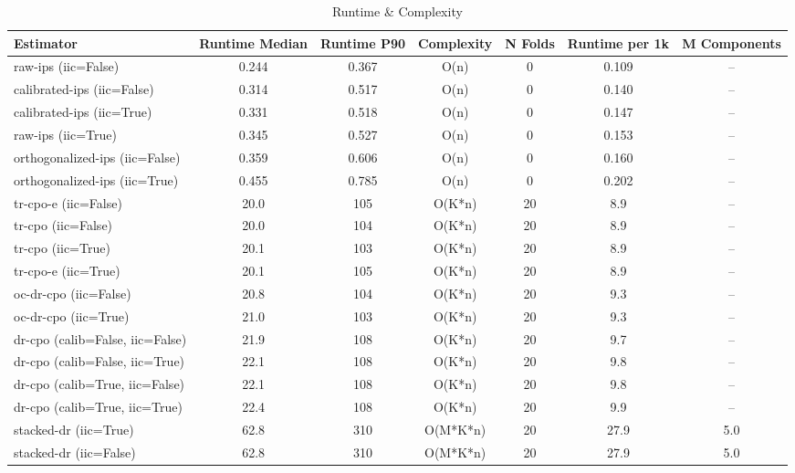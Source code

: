 \begin{table}[htbp]
\centering
\caption{Runtime & Complexity}
\label{tab:A6}
\begin{tabular}{l|cccccc}
\toprule
Estimator & Runtime Median & Runtime P90 & Complexity & N Folds & Runtime per 1k & M Components \\
\midrule
raw-ips (iic=False) & 0.244 & 0.367 & O(n) & 0 & 0.109 & -- \\
calibrated-ips (iic=False) & 0.314 & 0.517 & O(n) & 0 & 0.140 & -- \\
calibrated-ips (iic=True) & 0.331 & 0.518 & O(n) & 0 & 0.147 & -- \\
raw-ips (iic=True) & 0.345 & 0.527 & O(n) & 0 & 0.153 & -- \\
orthogonalized-ips (iic=False) & 0.359 & 0.606 & O(n) & 0 & 0.160 & -- \\
orthogonalized-ips (iic=True) & 0.455 & 0.785 & O(n) & 0 & 0.202 & -- \\
tr-cpo-e (iic=False) & 20.0 & 105 & O(K*n) & 20 & 8.9 & -- \\
tr-cpo (iic=False) & 20.0 & 104 & O(K*n) & 20 & 8.9 & -- \\
tr-cpo (iic=True) & 20.1 & 103 & O(K*n) & 20 & 8.9 & -- \\
tr-cpo-e (iic=True) & 20.1 & 105 & O(K*n) & 20 & 8.9 & -- \\
oc-dr-cpo (iic=False) & 20.8 & 104 & O(K*n) & 20 & 9.3 & -- \\
oc-dr-cpo (iic=True) & 21.0 & 103 & O(K*n) & 20 & 9.3 & -- \\
dr-cpo (calib=False, iic=False) & 21.9 & 108 & O(K*n) & 20 & 9.7 & -- \\
dr-cpo (calib=False, iic=True) & 22.1 & 108 & O(K*n) & 20 & 9.8 & -- \\
dr-cpo (calib=True, iic=False) & 22.1 & 108 & O(K*n) & 20 & 9.8 & -- \\
dr-cpo (calib=True, iic=True) & 22.4 & 108 & O(K*n) & 20 & 9.9 & -- \\
stacked-dr (iic=True) & 62.8 & 310 & O(M*K*n) & 20 & 27.9 & 5.0 \\
stacked-dr (iic=False) & 62.8 & 310 & O(M*K*n) & 20 & 27.9 & 5.0 \\
\bottomrule
\end{tabular}
\end{table}
